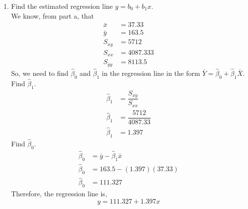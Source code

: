 \documentclass[12pt]{book}
\begin{document}
\begin{enumerate}
\begin{enumerate}
        \newpage
        
        \item Find the estimated regression line $y = b_0 + b_1x$.\\
        
        We know, from part a, that
        \begin{align*}
            \bar{x} &= 37.33\\
            \bar{y} &= 163.5\\
            S_{xy} &= 5712\\
            S_{xx} &= 4087.333\\
            S_{yy} &= 8113.5
        \end{align*}
        So, we need to find $\hat{\beta}_0$ and $\hat{\beta}_1$ in the regression line in the form $\bar{Y} = \hat{\beta}_0 + \hat{\beta}_1 \bar{X}$.\\
        
        Find $\hat{\beta}_1$.
        \begin{align*}
            \hat{\beta}_1 &= \dfrac{S_{xy}}{S_{xx}}\\
            \hat{\beta}_1 &= \dfrac{5712}{4087.33}\\
            \hat{\beta}_1 &= 1.397
        \end{align*}
        Find $\hat{\beta}_0$.
        \begin{align*}
            \hat{\beta}_0 &= \bar{y} - \hat{\beta}_1 \bar{x}\\
            \hat{\beta}_0 &= 163.5 - (1.397)(37.33)\\
            \hat{\beta}_0 &= 111.327
        \end{align*}
        Therefore, the regression line is,
        $$y = 111.327 + 1.397x$$
        

\end{enumerate}
\end{enumerate}
\end{document}
